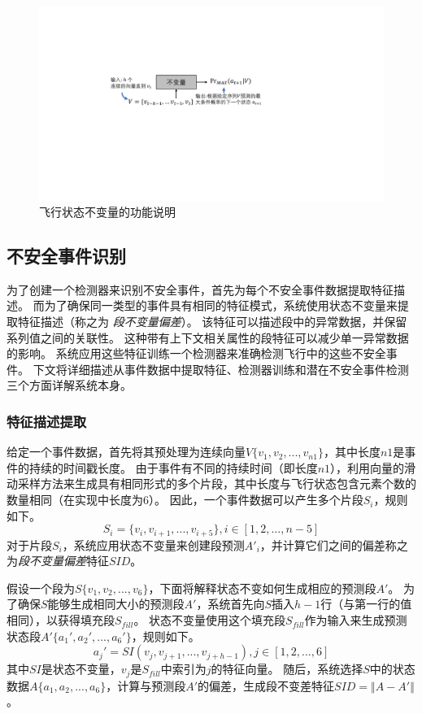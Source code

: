 \begin{figure}[ht]
  \centering
    \includegraphics[width=\columnwidth]{fig/check/invairant.pdf}
\caption{飞行状态不变量的功能说明}
\label{fig:check_invariant} 
\end{figure}  

\subsection{不安全事件识别}
为了创建一个检测器来识别不安全事件，\deccheck 首先为每个不安全事件数据提取特征描述。
而为了确保同一类型的事件具有相同的特征模式，系统使用状态不变量来提取特征描述（称之为 \emph{段不变量偏差}）。
该特征可以描述段中的异常数据，并保留系列值之间的关联性。
这种带有上下文相关属性的段特征可以减少单一异常数据的影响。
系统应用这些特征训练一个检测器来准确检测飞行中的这些不安全事件。
下文将详细描述从事件数据中提取特征、检测器训练和潜在不安全事件检测三个方面详解系统本身。

\subsubsection{特征描述提取}
给定一个事件数据，\deccheck 首先将其预处理为连续向量$V\{v_1,v_2,...,v_{n1}\}$，其中长度$n1$是事件的持续的时间戳长度。
由于事件有不同的持续时间（即长度$n1$），\deccheck 利用向量的滑动采样方法来生成具有相同形式的多个片段，其中长度与飞行状态包含元素个数的数量相同（在实现中长度为$6$）。
因此，一个事件数据可以产生多个片段$S_i$，规则如下。
\begin{equation}
S_i = \{v_i,v_{i+1},...,v_{i+5}\}, i\in[1,2,..., n-5]
\end{equation}
对于片段$S_i$，系统应用状态不变量来创建段预测$A'_i$，并计算它们之间的偏差称之为\emph{段不变量偏差}特征$SID$。

假设一个段为$S\{v_{1},v_{2},...,v_{6}\}$，下面将解释状态不变如何生成相应的预测段$A'$。
为了确保$S$能够生成相同大小的预测段$A'$，系统首先向$S$插入$h-1$行（与第一行的值相同），以获得填充段$S_{fill}$。
状态不变量使用这个填充段$S_{fill}$作为输入来生成预测状态段$A'\{a_1',a_2',...,a_6'\}$，规则如下。
\begin{equation}
a_j' = SI({v_j,v_{j+1},...,v_{j+h-1}}), j\in[1,2,...,6]
\end{equation}
其中$SI$是状态不变量，$v_j$是$S_{fill}$中索引为$j$的特征向量。
随后，系统选择$S$中的状态数据$A\{a_1,a_2,...,a_6\}$，计算与预测段$A'$的偏差，生成段不变差特征$SID = \Vert A - A' \Vert$。

